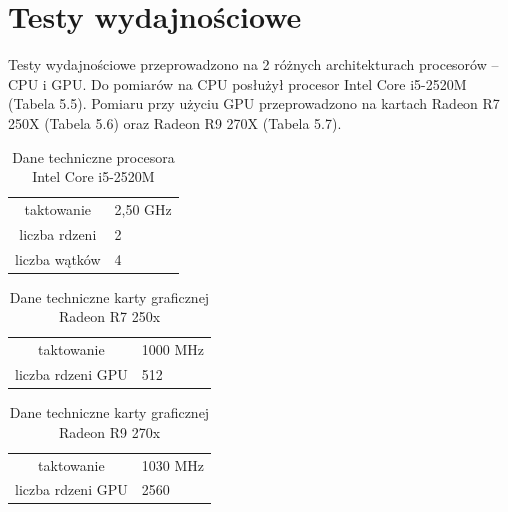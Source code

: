 \section{Testy wydajnościowe}\label{sec:asdas2d}

Testy wydajnościowe przeprowadzono na 2 różnych architekturach procesorów – CPU i GPU. Do pomiarów na CPU posłużył procesor Intel Core i5-2520M (Tabela 5.5). Pomiaru przy użyciu GPU przeprowadzono na kartach Radeon R7 250X (Tabela 5.6) oraz Radeon R9 270X (Tabela 5.7).
 
\begin{table}[h]
        \centering
        \begin{threeparttable}
                \caption{Dane techniczne procesora Intel Core i5-2520M}\label{tab:table_example}
                \begin{tabularx}{0.6\textwidth}{| c | X |}
                       \midrule
		taktowanie & 2,50 GHz \\
                     liczba rdzeni & 2 \\
                    liczba wątków & 4 \\
                        \bottomrule
                \end{tabularx}
        \end{threeparttable}
\end{table}

\begin{table}[h]
        \centering
        \begin{threeparttable}
                \caption{Dane techniczne karty graficznej Radeon R7 250x}\label{tab:table_example}
                \begin{tabularx}{0.6\textwidth}{| c | X |}
                       \midrule
		taktowanie & 1000 MHz \\
                     liczba rdzeni GPU & 512 \\
                        \bottomrule
                \end{tabularx}
        \end{threeparttable}
\end{table}

\begin{table}[h]
        \centering
        \begin{threeparttable}
                \caption{Dane techniczne karty graficznej Radeon R9 270x}\label{tab:table_example}
                \begin{tabularx}{0.6\textwidth}{| c | X |}
                       \midrule
		taktowanie & 1030 MHz \\
                     liczba rdzeni GPU & 2560 \\
                        \bottomrule
                \end{tabularx}
        \end{threeparttable}
\end{table}

